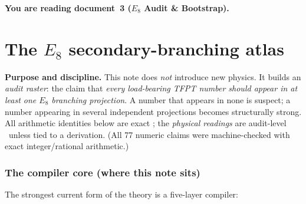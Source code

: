 \documentclass[11pt,a4paper]{article}
\newcommand{\gcar}{g_{\mathrm{car}}}
\newcommand{\cthree}{c_3}
\newcommand{\phiz}{\varphi_0^{\mathrm{ret}}}
\newcommand{\PP}{\mathbb{P}}
\theoremstyle{definition}
\begin{document}

\noindent\textbf{You are reading \textbf{document~3} ($E_8$ Audit \& Bootstrap).}


\TFPTbadges
\TFPTclaimstack[compiler]


\tableofcontents
\clearpage
\part{The $E_8$ secondary-branching atlas}
\par\smallskip\noindent\textbf{Purpose and discipline.}
This note does \emph{not} introduce new physics. It builds an \emph{audit raster}: the claim that
\emph{every load-bearing TFPT number should appear in at least one $E_8$ branching projection}. A number
that appears in none is suspect; a number appearing in several independent projections becomes
structurally strong. All arithmetic identities below are exact \mE; the \emph{physical readings} are
audit-level \mO\ unless tied to a derivation. (All 77 numeric claims were machine-checked with exact
integer/rational arithmetic.)

\section{The compiler core (where this note sits)}
The strongest current form of the theory is a five-layer compiler:

\begin{center}
\end{center}
\end{document}
